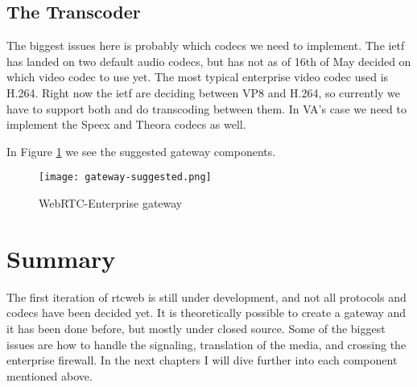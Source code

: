 \subsection{The Transcoder}
The biggest issues here is probably which codecs we need to implement. The \gls{ietf} has landed on two default audio codecs, but has not as of 16th of May decided on which video codec to use yet. The most typical enterprise video codec used is H.264. Right now the \gls{ietf} are deciding between VP8 and H.264, so currently we have to support both and do transcoding between them. In VA's case we need to implement the Speex and Theora codecs as well.

In Figure \ref{fig:gateway} we see the suggested gateway components.
\\
\begin{figure}[here]
\centerline{\texttt{[image: gateway-suggested.png]}}
\caption{WebRTC-Enterprise gateway}
\label{fig:gateway}
\end{figure}

\section{Summary}
The first iteration of \gls{rtcweb} is still under development, and not all protocols and codecs have been decided yet. It is theoretically possible to create a gateway and it has been done before, but mostly under closed source. Some of the biggest issues are how to handle the signaling, translation of the media, and crossing the enterprise firewall. In the next chapters I will dive further into each component mentioned above.
